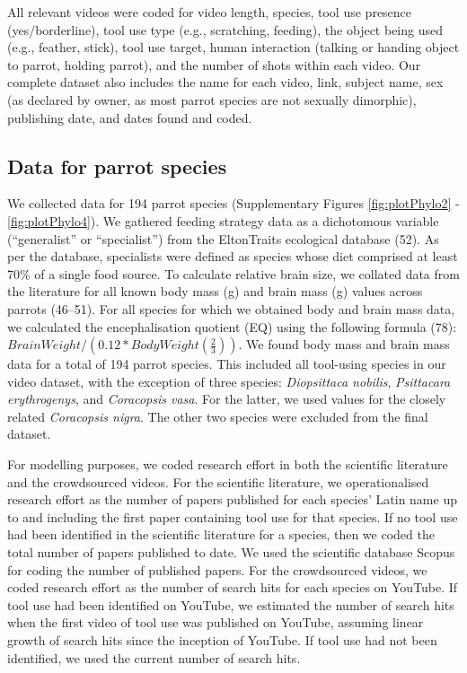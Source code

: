 \documentclass[
  man,floatsintext]{apa6}
\begin{document}
All relevant videos were coded for video length, species, tool use presence
(yes/borderline), tool use type (e.g., scratching, feeding), the object being
used (e.g., feather, stick), tool use target, human interaction
(talking or handing object to parrot, holding parrot), and the number of shots
within each video. Our complete dataset also includes the name for each video,
link, subject name, sex (as declared by owner, as most parrot species are not
sexually dimorphic), publishing date, and dates found and coded.

\hypertarget{data-for-parrot-species}{%
\subsection{Data for parrot species}\label{data-for-parrot-species}}

We collected data for 194 parrot species (Supplementary Figures
\ref{fig:plotPhylo2} - \ref{fig:plotPhylo4}). We gathered feeding strategy
data as a dichotomous variable (``generalist'' or ``specialist'') from the
EltonTraits ecological database (52). As per the database, specialists
were defined as species whose diet comprised at least 70\% of a single food
source. To calculate relative brain size, we collated data from the literature
for all known body mass (g) and brain mass (g) values across
parrots (46--51). For all species for which we obtained body and brain mass data, we
calculated the encephalisation quotient (EQ) using the following
formula (78): \(BrainWeight / (0.12 * BodyWeight(\frac{2}{3}))\). We
found body mass and brain mass data for a total of 194 parrot species. This
included all tool-using species in our video dataset, with the exception of
three species: \emph{Diopsittaca nobilis}, \emph{Psittacara erythrogenys}, and \emph{Coracopsis
vasa}. For the latter, we used values for the closely related \emph{Coracopsis
nigra}. The other two species were excluded from the final dataset.

For modelling purposes, we coded research effort in both the scientific
literature and the crowdsourced videos. For the scientific literature, we
operationalised research effort as the number of papers published for each
species' Latin name up to and including the first paper containing tool use for
that species. If no tool use had been identified in the scientific literature
for a species, then we coded the total number of papers published to date. We
used the scientific database Scopus for coding the number of published papers.
For the crowdsourced videos, we coded research effort as the number of search
hits for each species on YouTube. If tool use had been identified on YouTube, we
estimated the number of search hits when the first video of tool use was
published on YouTube, assuming linear growth of search hits since the inception
of YouTube. If tool use had not been identified, we used the current number of
search hits.
\end{document}
